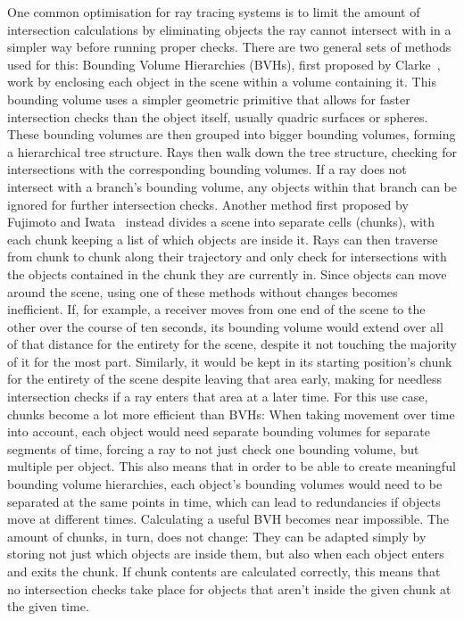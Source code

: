 One common optimisation for ray tracing systems is to limit the amount of intersection calculations by eliminating
objects the ray cannot intersect with in a simpler way before running proper checks.
There are two general sets of methods used for this:
\newline
Bounding Volume Hierarchies (BVHs), first proposed by Clarke~\cite{Cl76},
work by enclosing each object in the scene within a volume containing it.
This bounding volume uses a simpler geometric primitive that allows for faster intersection checks than the object itself,
usually quadric surfaces or spheres.
These bounding volumes are then grouped into bigger bounding volumes, forming a hierarchical tree structure.
Rays then walk down the tree structure, checking for intersections with the corresponding bounding volumes.
If a ray does not intersect with a branch's bounding volume,
any objects within that branch can be ignored for further intersection checks.
\newline
Another method first proposed by Fujimoto and Iwata~\cite{FI85}
instead divides a scene into separate cells (chunks),
with each chunk keeping a list of which objects are inside it.
Rays can then traverse from chunk to chunk along their trajectory
and only check for intersections with the objects contained in the chunk they are currently in.
\newline
Since objects can move around the scene, using one of these methods without changes becomes inefficient.
If, for example, a receiver moves from one end of the scene to the other over the course of ten seconds,
its bounding volume would extend over all of that distance for the entirety for the scene, despite it not touching
the majority of it for the most part.
Similarly, it would be kept in its starting position's chunk for the entirety of the scene despite leaving that area early,
making for needless intersection checks if a ray enters that area at a later time.
\newline
For this use case, chunks become a lot more efficient than BVHs:
When taking movement over time into account, each object would need separate bounding volumes for separate segments of time,
forcing a ray to not just check one bounding volume, but multiple per object.
This also means that in order to be able to create meaningful bounding volume hierarchies,
each object's bounding volumes would need to be separated at the same points in time,
which can lead to redundancies if objects move at different times.
Calculating a useful BVH becomes near impossible.
\newline
The amount of chunks, in turn, does not change:
They can be adapted simply by storing not just which objects are inside them,
but also when each object enters and exits the chunk.
If chunk contents are calculated correctly,
this means that no intersection checks take place for objects that aren't inside the given chunk at the given time.

